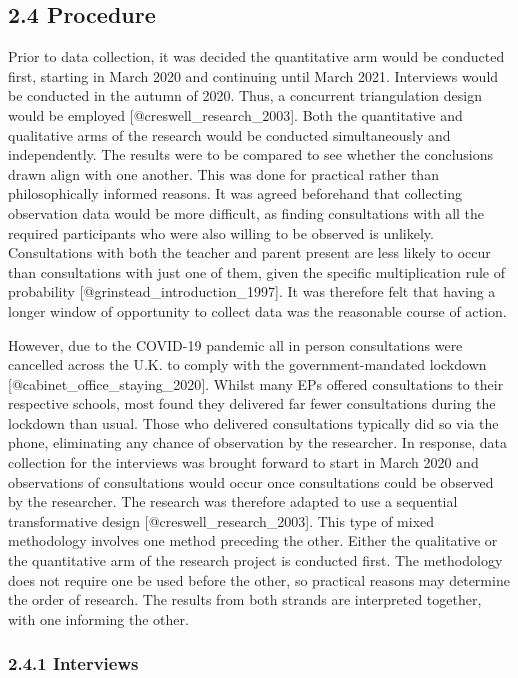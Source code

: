\documentclass[
]{article}
\begin{document}
\hypertarget{procedure}{%
\subsection{2.4 Procedure}\label{procedure}}

Prior to data collection, it was decided the quantitative arm would be
conducted first, starting in March 2020 and continuing until March 2021.
Interviews would be conducted in the autumn of 2020. Thus, a concurrent
triangulation design would be employed {[}@creswell\_research\_2003{]}.
Both the quantitative and qualitative arms of the research would be
conducted simultaneously and independently. The results were to be
compared to see whether the conclusions drawn align with one another.
This was done for practical rather than philosophically informed
reasons. It was agreed beforehand that collecting observation data would
be more difficult, as finding consultations with all the required
participants who were also willing to be observed is unlikely.
Consultations with both the teacher and parent present are less likely
to occur than consultations with just one of them, given the specific
multiplication rule of probability {[}@grinstead\_introduction\_1997{]}.
It was therefore felt that having a longer window of opportunity to
collect data was the reasonable course of action.

However, due to the COVID-19 pandemic all in person consultations were
cancelled across the U.K. to comply with the government-mandated
lockdown {[}@cabinet\_office\_staying\_2020{]}. Whilst many EPs offered
consultations to their respective schools, most found they delivered far
fewer consultations during the lockdown than usual. Those who delivered
consultations typically did so via the phone, eliminating any chance of
observation by the researcher. In response, data collection for the
interviews was brought forward to start in March 2020 and observations
of consultations would occur once consultations could be observed by the
researcher. The research was therefore adapted to use a sequential
transformative design {[}@creswell\_research\_2003{]}. This type of
mixed methodology involves one method preceding the other. Either the
qualitative or the quantitative arm of the research project is conducted
first. The methodology does not require one be used before the other, so
practical reasons may determine the order of research. The results from
both strands are interpreted together, with one informing the other.

\hypertarget{interviews-1}{%
\subsubsection{2.4.1 Interviews}\label{interviews-1}}
\end{document}
